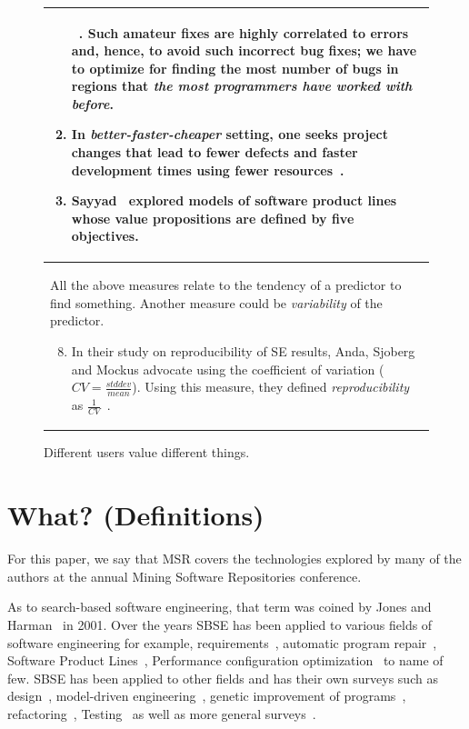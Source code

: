\documentclass[sigconf]{acmart}
\begin{document}
\begin{figure}[b]
\begin{tabular}{p{.95\linewidth}}
\begin{enumerate}[leftmargin=0.4cm]
~\cite{me11f}.
Such amateur fixes are highly correlated to errors and, hence, to
avoid such incorrect bug fixes; we have to optimize
for finding the most number of bugs in regions that {\em the most programmers have worked with before}.
\item In {\em better-faster-cheaper} setting, one seeks  project changes that lead
to fewer defects and faster development times using fewer resources~\cite{elrawas10,me07f,me09a,me09f}.
\item
Sayyad~\cite{sayyad13a,sayyad13b} explored models of software product
lines whose value propositions are defined by five objectives.
\end{enumerate}
\\ \hline
\rowcolor{gray!10}
All the above measures relate to the tendency of a predictor to find something. Another measure could be {\em variability} of the predictor.
\begin{enumerate}[leftmargin=0.4cm]
\setcounter{enumi}{7}
\item
In their study on reproducibility of SE results,
 Anda, Sjoberg and Mockus advocate using the coefficient of variation ($CV=\frac{stddev}{mean}$).
Using this measure, they defined {\em reproducibility} as $\frac{1}{CV}$~\cite{mockus09}.
\end{enumerate}\\\hline
\end{tabular}
\caption[Different users value different things.]{Different users value different things.
}\label{fig:goals}
\end{figure}


\section{What? (Definitions)}

For this paper, we say that MSR covers the technologies
explored by many of the authors at the annual Mining Software Repositories
conference.

As to search-based software engineering, that term was coined by Jones and Harman~\cite{harman2001search} in 2001.
Over the years SBSE has been applied to various fields of software engineering for example, requirements~\cite{ZhangHL13, chen2017beyond}, automatic program repair~\cite{le2012genprog}, Software Product Lines~\cite{chen2017sampling, sayyad13a, guo2017smtibea}, Performance configuration optimization~\cite{nair2017faster,nair2017using, guo2017data, oh2017finding, nair2018finding} to name of few. SBSE has been applied to other fields and has their own surveys such as design~\cite{raiha2010survey}, model-driven engineering~\cite{boussaid2017survey}, genetic improvement of programs~\cite{petke2017genetic}, refactoring~\cite{mariani2017systematic}, Testing~\cite{silva2017systematic, khari2017extensive} as well as more general surveys~\cite{clarke2003reformulating, harman2007current}. 
\end{document}
